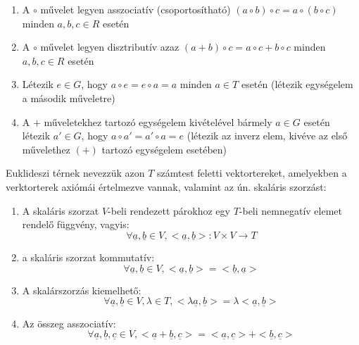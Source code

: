 \documentclass[11pt,a4paper]{article}
\begin{document}
\begin{tcolorbox}[colback=blue!5!white,colframe=blue!70!black,title= 1. Csoport{,} gyűrű{,} test]
\begin{enumerate}
            \item A \(\circ\) művelet legyen asszociatív (csoportosítható) \((a \circ b) \circ c = a \circ (b \circ c)\) minden \(a, b, c \in R\) esetén
            \item A \(\circ\) művelet legyen disztributív azaz \((a + b) \circ c = a \circ c + b \circ c\) minden \(a, b, c \in R\) esetén
            \item Létezik \(e \in G\), hogy \(a \circ e = e \circ a = a\) minden \(a \in T\) esetén (létezik egységelem a második műveletre)
            \item A \(+\) műveletekhez tartozó egységelem kivételével bármely \(a \in G\) esetén létezik \(a' \in G\), hogy \(a \circ a' = a' \circ a = e\) (létezik az inverz elem, kivéve az első művelethez \((+)\) tartozó egységelem
            esetében)
        \end{enumerate}
\end{tcolorbox}

\begin{tcolorbox}[colback=blue!5!white,colframe=blue!70!black,title= 2. Euklideszi tér]
Euklideszi térnek nevezzük azon \(T\) számtest feletti vektortereket, amelyekben a verktorterek axiómái értelmezve vannak, valamint az ún. skaláris szorzást:    
    \begin{enumerate}
        \item A skaláris szorzat \(V\)-beli rendezett párokhoz egy \(T\)-beli nemnegatív elemet rendelő függvény, vagyis:
        $$\forall \underline{a},\underline{b} \in V,<\underline{a},\underline{b}>:V \times V \to T$$
        \item a skaláris szorzat kommutatív:
        $$\forall \underline{a}, \underline{b} \in V, <\underline{a}, \underline{b} > =<\underline{b}, \underline{a} >$$
        \item A skalárszorzás kiemelhető:
        $$\forall \underline {a},\underline{b} \in V, \lambda \in T, <\lambda \underline{a}, \underline{b} > = \lambda <\underline{a}, \underline{b}>$$
        \item Az összeg asszociatív:
        $$\forall \underline{a}, \underline{b}, \underline{c} \in V, <\underline{a} + \underline{b},\underline{c}> = <\underline{a}, \underline{c}> + <\underline{b}, \underline{c}>$$
    \end{enumerate}
\end{tcolorbox}
\end{document}
